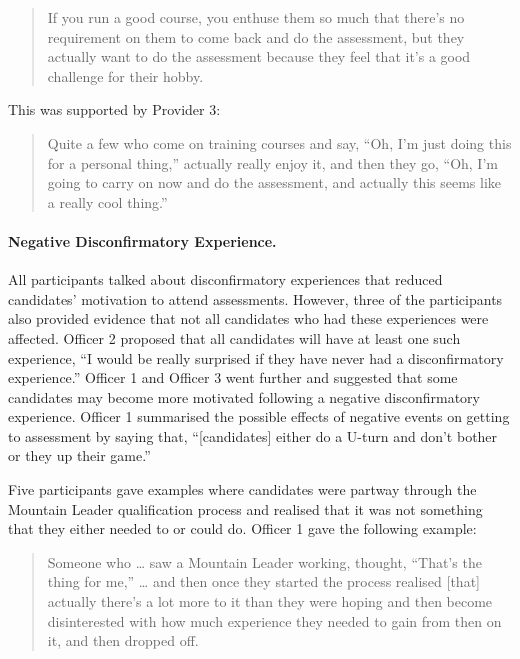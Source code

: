 \documentclass[
  12pt,
  a4paper,
]{book}
\begin{document}
\begin{quote}
If you run a good course, you enthuse them so much that there's no requirement on them to come back and do the assessment, but they actually want to do the assessment because they feel that it's a good challenge for their hobby.
\end{quote}

This was supported by Provider 3:

\begin{quote}
Quite a few who come on training courses and say, ``Oh, I'm just doing this for a personal thing,'' actually really enjoy it, and then they go, ``Oh, I'm going to carry on now and do the assessment, and actually this seems like a really cool thing.''
\end{quote}

\hypertarget{negative-disconfirmatory-experience.}{%
\paragraph{Negative Disconfirmatory Experience.}\label{negative-disconfirmatory-experience.}}

All participants talked about disconfirmatory experiences that reduced candidates' motivation to attend assessments. However, three of the participants also provided evidence that not all candidates who had these experiences were affected. Officer 2 proposed that all candidates will have at least one such experience, ``I would be really surprised if they have never had a disconfirmatory experience.'' Officer 1 and Officer 3 went further and suggested that some candidates may become more motivated following a negative disconfirmatory experience. Officer 1 summarised the possible effects of negative events on getting to assessment by saying that, ``{[}candidates{]} either do a U-turn and don't bother or they up their game.''

Five participants gave examples where candidates were partway through the Mountain Leader qualification process and realised that it was not something that they either needed to or could do. Officer 1 gave the following example:

\begin{quote}
Someone who \ldots{} saw a Mountain Leader working, thought, ``That's the thing for me,'' \ldots{} and then once they started the process realised {[}that{]} actually there's a lot more to it than they were hoping and then become disinterested with how much experience they needed to gain from then on it, and then dropped off.
\end{quote}
\end{document}
